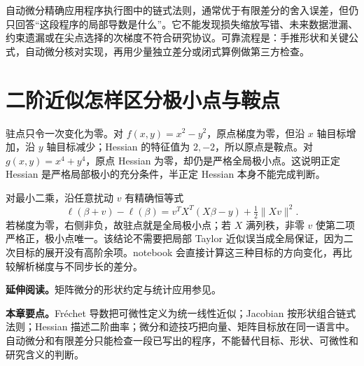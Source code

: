 自动微分精确应用程序执行图中的链式法则，通常优于有限差分的舍入误差，但仍只回答“这段程序的局部导数是什么”。它不能发现损失缩放写错、未来数据泄漏、约束遗漏或在尖点选择的次梯度不符合研究协议。可靠流程是：手推形状和关键公式，自动微分核对实现，再用少量独立差分或闭式算例做第三方检查。

\section{二阶近似怎样区分极小点与鞍点}
驻点只令一次变化为零。对 $f(x,y)=x^2-y^2$，原点梯度为零，但沿 $x$ 轴目标增加，沿 $y$ 轴目标减少；Hessian 的特征值为 $2,-2$，所以原点是鞍点。对 $g(x,y)=x^4+y^4$，原点 Hessian 为零，却仍是严格全局极小点。这说明正定 Hessian 是严格局部极小的充分条件，半正定 Hessian 本身不能完成判断。

对最小二乘，沿任意扰动 $v$ 有精确恒等式
\[
 \ell(\beta+v)-\ell(\beta)
 =v^TX^T(X\beta-y)+\tfrac12\|Xv\|^2.
\]
若梯度为零，右侧非负，故驻点就是全局极小点；若 $X$ 满列秩，非零 $v$ 使第二项严格正，极小点唯一。该结论不需要把局部 Taylor 近似误当成全局保证，因为二次目标的展开没有高阶余项。notebook 会直接计算这三种目标的方向变化，再比较解析梯度与不同步长的差分。

\noindent\textbf{延伸阅读。}矩阵微分的形状约定与统计应用参见\cite{magnus2019matrix}。




\noindent\textbf{本章要点。}Fréchet 导数把可微性定义为统一线性近似；Jacobian 按形状组合链式法则；Hessian 描述二阶曲率；微分和迹技巧把向量、矩阵目标放在同一语言中。自动微分和有限差分只能检查一段已写出的程序，不能替代目标、形状、可微性和研究含义的判断。
